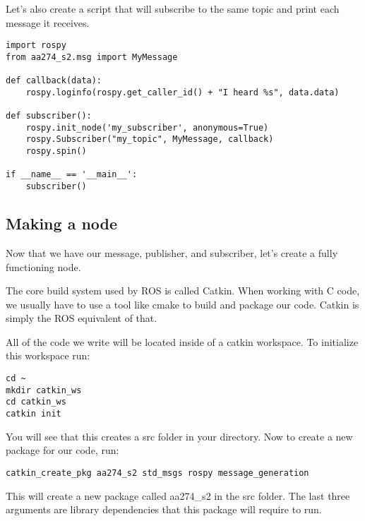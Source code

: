 Let's also create a script that will subscribe to the same topic and print each message it receives.

\begin{tcolorbox}
\begin{lstlisting}
import rospy
from aa274_s2.msg import MyMessage

def callback(data):
    rospy.loginfo(rospy.get_caller_id() + "I heard %s", data.data)

def subscriber():
    rospy.init_node('my_subscriber', anonymous=True)
    rospy.Subscriber("my_topic", MyMessage, callback)
    rospy.spin()

if __name__ == '__main__':
    subscriber()
\end{lstlisting}
\end{tcolorbox}




\subsection{Making a node}
Now that we have our message, publisher, and subscriber, let's create a fully functioning node.

The core build system used by ROS is called Catkin. When working with C code, we usually have to use a tool like cmake to build and package our code. Catkin is simply the ROS equivalent of that. 

All of the code we write will be located inside of a catkin workspace. To initialize this workspace run:

\begin{tcolorbox}
\begin{lstlisting}
cd ~
mkdir catkin_ws 
cd catkin_ws
catkin init
\end{lstlisting}
\end{tcolorbox}

You will see that this creates a src folder in your directory. Now to create a new package for our code, run:

\begin{tcolorbox}
\begin{lstlisting}
catkin_create_pkg aa274_s2 std_msgs rospy message_generation
\end{lstlisting}
\end{tcolorbox}

This will create a new package called aa274\_s2 in the src folder. The last three arguments are library dependencies that this package will require to run.

